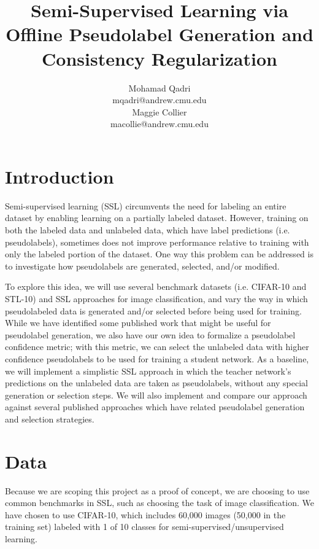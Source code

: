 \documentclass{article}
\title{Semi-Supervised Learning via Offline Pseudolabel Generation and Consistency Regularization}
\author{%
  Mohamad Qadri \\
  mqadri@andrew.cmu.edu\\
  \And Maggie Collier\\
  macollie@andrew.cmu.edu\\
}
\begin{document}
\maketitle
\section{Introduction}
Semi-supervised learning (SSL) circumvents the need for labeling an entire dataset by enabling learning on a partially labeled dataset. However, training on both the labeled data and unlabeled data, which have label predictions (i.e. pseudolabels), sometimes does not improve performance relative to training with only the labeled portion of the dataset. One way this problem can be addressed is to investigate how pseudolabels are generated, selected, and/or modified.

To explore this idea, we will use several benchmark datasets (i.e. CIFAR-10 and STL-10) and SSL approaches for image classification, and vary the way in which pseudolabeled data is generated and/or selected before being used for training. While we have identified some published work that might be useful for pseudolabel generation, we also have our own idea to formalize a pseudolabel confidence metric; with this metric, we can select the unlabeled data with higher confidence pseudolabels to be used for training a student network. As a baseline, we will implement a simplistic SSL approach in which the teacher network's predictions on the unlabeled data are taken as pseudolabels, without any special generation or selection steps. We will also implement and compare our approach against several published approaches which have related pseudolabel generation and selection strategies.
\section{Data}
Because we are scoping this project as a proof of concept, we are choosing to use common benchmarks in SSL, such as choosing the task of image classification. We have chosen to use CIFAR-10, which includes 60,000 images (50,000 in the training set) labeled with 1 of 10 classes for semi-supervised/unsupervised learning. 
\end{document}
